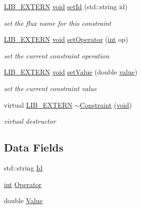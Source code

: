 \begin{DoxyCompactItemize}
\hyperlink{libutil_8h_a48cc004c21e097c0d7c1c5fa8dc03b96}{L\+I\+B\+\_\+\+E\+X\+T\+E\+RN} \hyperlink{lp__lib_8h_ac7828c7b2b31d2e11af17bdb6289c5d9}{void} \hyperlink{class_l_i_b___s_t_r_u_c_t_u_r_a_l_1_1_constraint_a0e6ad4a1c25f951875e774827bfbf09d}{set\+Id} (std\+::string id)
\begin{DoxyCompactList}\small\item\em set the flux name for this constraint \end{DoxyCompactList}\item 
\hyperlink{libutil_8h_a48cc004c21e097c0d7c1c5fa8dc03b96}{L\+I\+B\+\_\+\+E\+X\+T\+E\+RN} \hyperlink{lp__lib_8h_ac7828c7b2b31d2e11af17bdb6289c5d9}{void} \hyperlink{class_l_i_b___s_t_r_u_c_t_u_r_a_l_1_1_constraint_ad772817f6ab1723078b00af276c3c997}{set\+Operator} (\hyperlink{lp__lib_8h_adeb9ec6400320e4923ac9d836d509ddb}{int} op)
\begin{DoxyCompactList}\small\item\em set the current constraint operation \end{DoxyCompactList}\item 
\hyperlink{libutil_8h_a48cc004c21e097c0d7c1c5fa8dc03b96}{L\+I\+B\+\_\+\+E\+X\+T\+E\+RN} \hyperlink{lp__lib_8h_ac7828c7b2b31d2e11af17bdb6289c5d9}{void} \hyperlink{class_l_i_b___s_t_r_u_c_t_u_r_a_l_1_1_constraint_a59e1f3235dd18b386bd361e04046c421}{set\+Value} (double \hyperlink{lp__lib_8h_a606ba870f46e132d61b5e2371014a998}{value})
\begin{DoxyCompactList}\small\item\em set the current constraint value \end{DoxyCompactList}\item 
virtual \hyperlink{libutil_8h_a48cc004c21e097c0d7c1c5fa8dc03b96}{L\+I\+B\+\_\+\+E\+X\+T\+E\+RN} \hyperlink{class_l_i_b___s_t_r_u_c_t_u_r_a_l_1_1_constraint_a2a81fd088a9ebfd4f87d1e384e4122e6}{$\sim$\+Constraint} (\hyperlink{lp__lib_8h_ac7828c7b2b31d2e11af17bdb6289c5d9}{void})
\begin{DoxyCompactList}\small\item\em virtual destructor \end{DoxyCompactList}\end{DoxyCompactItemize}
\subsection*{Data Fields}
\begin{DoxyCompactItemize}
\item 
std\+::string \hyperlink{class_l_i_b___s_t_r_u_c_t_u_r_a_l_1_1_constraint_af3568c8ace43d617c795ff89e3fd2b29}{Id}
\item 
\hyperlink{lp__lib_8h_adeb9ec6400320e4923ac9d836d509ddb}{int} \hyperlink{class_l_i_b___s_t_r_u_c_t_u_r_a_l_1_1_constraint_a09ba2b49e78e10547da7b88659829bc4}{Operator}
\item 
double \hyperlink{class_l_i_b___s_t_r_u_c_t_u_r_a_l_1_1_constraint_acd7b4fdd51e689c4be4ea10bc7ce754c}{Value}
\end{DoxyCompactItemize}



